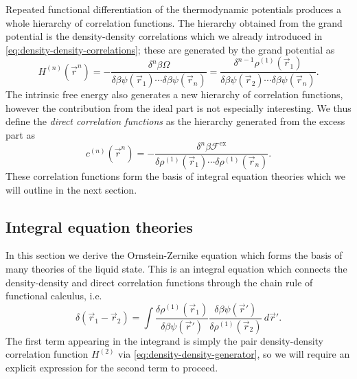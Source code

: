 Repeated functional differentiation of the thermodynamic potentials produces a whole hierarchy of correlation functions.
The hierarchy obtained from the grand potential is the density-density correlations which we already introduced in \eqref{eq:density-density-correlations};
these are generated by the grand potential as \cite{Hansen2013}
\begin{equation}\label{eq:density-density-generator}
  H^{(n)}(\vec{r}^n)
  =
  - \frac{
    \delta^n \beta \Omega
  }{
    \delta \beta\psi(\vec{r}_1) \cdots \delta \beta\psi(\vec{r}_n)
  }
  =
  \frac{
    \delta^{n-1} \rho^{(1)}(\vec{r}_1)
  }{
    \delta \beta\psi(\vec{r}_2) \cdots \delta \beta\psi(\vec{r}_n)
  }.
\end{equation}
The intrinsic free energy also generates a new hierarchy of correlation functions, however the contribution from the ideal part is not especially interesting.
We thus define the \emph{direct correlation functions} as the hierarchy generated from the excess part as
\begin{equation}\label{eq:direct-correlations}
  c^{(n)}(\vec{r}^n)
  =
  - \frac{
    \delta^n \beta \mathcal{F}^\mathrm{ex}
  }{
    \delta \rho^{(1)}(\vec{r}_1) \cdots \delta \rho^{(1)}(\vec{r}_n)
  }.
\end{equation}
These correlation functions form the basis of integral equation theories which we will outline in the next section.

\subsection{Integral equation theories}
\label{sec:oz-equation}

In this section we derive the Ornstein-Zernike equation which forms the basis of many theories of the liquid state.
This is an integral equation which connects the density-density and direct correlation functions through the chain rule of functional calculus, i.e.\
\begin{equation}\label{eq:oz-chain-rule}
  \delta(\vec{r}_1 - \vec{r}_2) =
  \int
  \frac{\delta \rho^{(1)}(\vec{r}_1)}{\delta \beta\psi(\vec{r}')}
  \frac{\delta \beta\psi(\vec{r}')}{\delta \rho^{(1)}(\vec{r}_2)}
  \, d\vec{r}'.
\end{equation}
The first term appearing in the integrand is simply the pair density-density correlation function $H^{(2)}$ via \eqref{eq:density-density-generator},
so we will require an explicit expression for the second term to proceed.

